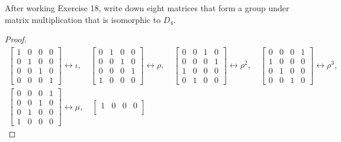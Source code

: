 \newpage
\begin{exercise}
    After working Exercise 18, write down eight matrices that form a group under matrix multiplication that is isomorphic to $D_{4}$.
\end{exercise}

\begin{proof}
    \[
        \begin{split}
            \begin{bmatrix}
                1 & 0 & 0 & 0 \\
                0 & 1 & 0 & 0 \\
                0 & 0 & 1 & 0 \\
                0 & 0 & 0 & 1
            \end{bmatrix}\leftrightarrow\iota,\quad
            \begin{bmatrix}
                0 & 1 & 0 & 0 \\
                0 & 0 & 1 & 0 \\
                0 & 0 & 0 & 1 \\
                1 & 0 & 0 & 0
            \end{bmatrix}\leftrightarrow\rho,\quad
            \begin{bmatrix}
                0 & 0 & 1 & 0 \\
                0 & 0 & 0 & 1 \\
                1 & 0 & 0 & 0 \\
                0 & 1 & 0 & 0
            \end{bmatrix}\leftrightarrow\rho^{2},\quad
            \begin{bmatrix}
                0 & 0 & 0 & 1 \\
                1 & 0 & 0 & 0 \\
                0 & 1 & 0 & 0 \\
                0 & 0 & 1 & 0
            \end{bmatrix}\leftrightarrow\rho^{3}, \\
            \begin{bmatrix}
                0 & 0 & 0 & 1 \\
                0 & 0 & 1 & 0 \\
                0 & 1 & 0 & 0 \\
                1 & 0 & 0 & 0
            \end{bmatrix}\leftrightarrow\mu,\quad
            \begin{bmatrix}
                1 & 0 & 0 & 0 \\

\end{bmatrix}
\end{split}\]
\end{proof}
